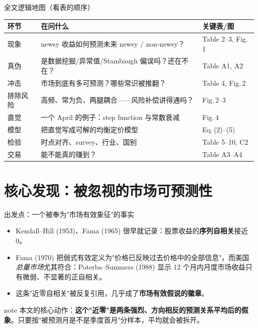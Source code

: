 \documentclass[aspectratio=169,10pt]{beamer}
\newcommand{\tabnote}[1]{\vspace{2pt}{\scriptsize\textcolor{gray!70!black}{#1}}}
\newcommand{\tighttable}{\scriptsize\setlength{\tabcolsep}{3pt}\renewcommand{\arraystretch}{1.12}}
\begin{document}
\begin{frame}{全文逻辑地图（看表的顺序）}
	\tighttable
	\begin{tabularx}{\textwidth}{lYl}
		\toprule
		环节 & 在问什么 & 关键表/图 \\
		\midrule
		现象 & newsy 收益如何预测未来 newsy / non-newsy？ & Table 2--3, Fig.\,1 \\
		真伪 & 是数据挖掘/异常值/Stambaugh 偏误吗？还在不在？ & Table A1, A2 \\
		冲击 & 市场到底有多可预测？哪些常识被推翻？ & Table 4, Fig.\,2 \\
		排除风险 & 高频、常为负、两腿耦合——风险补偿讲得通吗？ & Fig.\,2--3 \\
		直觉 & 一个 April 的例子：step function 与常数衰减 & Fig.\,4 \\
		模型 & 把直觉写成可解的均衡定价模型 & Eq.\,(2)--(5) \\
		检验 & 时点对齐、survey、行业、国别 & Table 5--10, C2 \\
		交易 & 能不能真的赚到？ & Table A3--A4 \\
		\bottomrule
	\end{tabularx}
	\tabnote{下文每张表都对应三个问题：这张表想检验什么？关键数字是多少？它在多大程度上支持作者主张？}
\end{frame}

\section{核心发现：被忽视的市场可预测性}

\begin{frame}{出发点：一个被奉为"市场有效象征"的事实}
	\begin{itemize}
		\item Kendall--Hill (1953)、Fama (1965) 很早就记录：股票收益的\textbf{序列自相关}接近 0。
		\item Fama (1970) 把弱式有效定义为"价格已反映过去价格中的全部信息"，而美国\emph{总量市场}尤其符合：Poterba--Summers (1988) 显示 12 个月内月度市场收益只有微弱、不显著的正自相关。
		\item 这条"近零自相关"被反复引用，几乎成了\textbf{市场有效假说的徽章}。
	\end{itemize}
	\vspace{4pt}
	\begin{beamercolorbox}[sep=0.45em,wd=\linewidth,rounded=true]{note}
		本文的核心动作：\textbf{这个"近零"是两条强烈、方向相反的预测关系平均后的假象}。只要按"被预测月是不是季度首月"分样本，平均就会被拆开。
	\end{beamercolorbox}
\end{frame}
\end{document}
